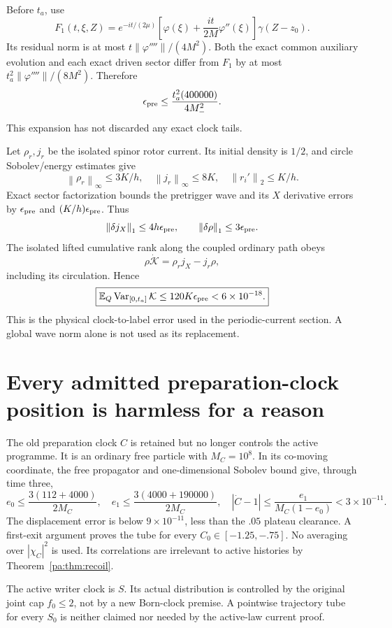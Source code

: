 \documentclass[11pt]{article}
\theoremstyle{definition}\newtheorem{definition}[theorem]{Definition}
\theoremstyle{remark}\newtheorem{remark}[theorem]{Remark}
\newcommand{\norm}[1]{\left\lVert#1\right\rVert}
\begin{document}
Before $t_a$, use
\[
 F_1(t,\xi,Z)=e^{-it/(2\mu)}
 \left[\varphi(\xi)+\frac{it}{2M}\varphi''(\xi)\right]\gamma(Z-z_0).
\]
Its residual norm is at most $t\norm{\varphi''''}/(4M^2)$. Both the exact common auxiliary evolution and each exact driven sector differ from $F_1$ by at most $t_a^2\norm{\varphi''''}/(8M^2)$. Therefore
\[
 \epsilon_{\rm pre}\le\frac{t_a^2(400000)}{4M_-^2}.
\]
This expansion has not discarded any exact clock tails.

Let $\rho_r,j_r$ be the isolated spinor rotor current. Its initial density is $1/2$, and circle Sobolev/energy estimates give
\[
 \norm{\rho_r}_\infty\le3K/h,\quad
 \norm{j_r}_\infty\le8K,\quad \norm{r_i'}_2\le K/h.
\]
Exact sector factorization bounds the pretrigger wave and its $X$ derivative errors by $\epsilon_{\rm pre}$ and $(K/h)\epsilon_{\rm pre}$. Thus
\[
 \norm{\delta j_X}_1\le4h\epsilon_{\rm pre},\qquad
 \norm{\delta\rho}_1\le3\epsilon_{\rm pre}.
\]
The isolated lifted cumulative rank along the coupled ordinary path obeys
\[
 \rho\dot{\mathcal K}=\rho_rj_X-j_r\rho,
\]
including its circulation. Hence
\[
 \boxed{\mathbb E_Q\operatorname{Var}_{[0,t_a]}\mathcal K
 \le120K\epsilon_{\rm pre}<6\times10^{-18}.}
\]
This is the physical clock-to-label error used in the periodic-current section. A global wave norm alone is not used as its replacement.

\section{Every admitted preparation-clock position is harmless for a reason}
The old preparation clock $C$ is retained but no longer controls the active programme. It is an ordinary free particle with $M_C=10^8$. In its co-moving coordinate, the free propagator and one-dimensional Sobolev bound give, through time three,
\[
 e_0\le\frac{3(112+4000)}{2M_C},\quad
 e_1\le\frac{3(4000+190000)}{2M_C},\quad
 |\dot C-1|\le\frac{e_1}{M_C(1-e_0)}<3\times10^{-11}.
\]
The displacement error is below $9\times10^{-11}$, less than the $.05$ plateau clearance. A first-exit argument proves the tube for every $C_0\in[-1.25,-.75]$. No averaging over $|\chi_C|^2$ is used. Its correlations are irrelevant to active histories by Theorem~\ref{pa:thm:recoil}.

The active writer clock is $S$. Its actual distribution is controlled by the original joint cap $f_0\le2$, not by a new Born-clock premise. A pointwise trajectory tube for every $S_0$ is neither claimed nor needed by the active-law current proof.

\end{document}
